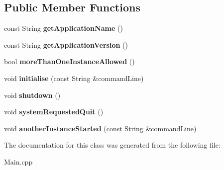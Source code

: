 \subsection*{Public Member Functions}
\begin{DoxyCompactItemize}
\item 
\hypertarget{classjuced_application_ac8359cc003408393d1c8ffb037fb6100}{const String {\bfseries get\-Application\-Name} ()}\label{classjuced_application_ac8359cc003408393d1c8ffb037fb6100}

\item 
\hypertarget{classjuced_application_a8f9a4e7898e52c2524732e7b383a5410}{const String {\bfseries get\-Application\-Version} ()}\label{classjuced_application_a8f9a4e7898e52c2524732e7b383a5410}

\item 
\hypertarget{classjuced_application_ac4333a950fa796584c2148d79c24759a}{bool {\bfseries more\-Than\-One\-Instance\-Allowed} ()}\label{classjuced_application_ac4333a950fa796584c2148d79c24759a}

\item 
\hypertarget{classjuced_application_ae6fb37901a7ff5cff03dab675b3addbc}{void {\bfseries initialise} (const String \&command\-Line)}\label{classjuced_application_ae6fb37901a7ff5cff03dab675b3addbc}

\item 
\hypertarget{classjuced_application_a0797b147fcec847bd1823841b6c1a537}{void {\bfseries shutdown} ()}\label{classjuced_application_a0797b147fcec847bd1823841b6c1a537}

\item 
\hypertarget{classjuced_application_a54020d2b1ceeb103551c1c6db46a4a93}{void {\bfseries system\-Requested\-Quit} ()}\label{classjuced_application_a54020d2b1ceeb103551c1c6db46a4a93}

\item 
\hypertarget{classjuced_application_a660585773f17554bd062bb9ae2e27358}{void {\bfseries another\-Instance\-Started} (const String \&command\-Line)}\label{classjuced_application_a660585773f17554bd062bb9ae2e27358}

\end{DoxyCompactItemize}


The documentation for this class was generated from the following file\-:\begin{DoxyCompactItemize}
\item 
Main.\-cpp\end{DoxyCompactItemize}
